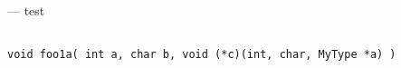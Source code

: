 \startmanpage
{}
--- test  
\startvb\begin{verbatim}

void foo1a( int a, char b, void (*c)(int, char, MyType *a) )

\end{verbatim}
\endvb

\endmanpage
